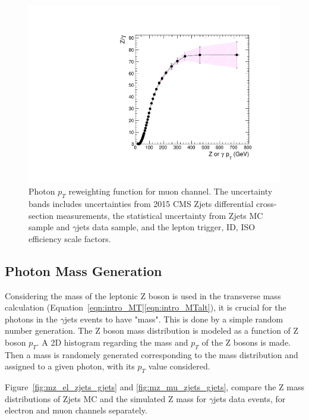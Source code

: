 \begin{figure}[htbp]
\centering
  \includegraphics[width=0.9\linewidth]{figures/study_gjets_data_allcorV2_modify_mu.pdf}
  \caption{Photon $p_T$ reweighting function for muon channel.
 The uncertainty bands includes uncertainties from 2015 CMS Zjets differential cross-section measurements, the statistical uncertainty from Zjets MC sample and $\gamma$jets data sample, and the lepton trigger, ID, ISO efficiency scale factors.}
  \label{fig:photon_pt_weight_mu}
\end{figure}

\subsection{Photon Mass Generation}
Considering the mass of the leptonic Z boson is used in the transverse mass calculation (Equation~\ref{eqn:intro_MT}\ref{eqn:intro_MTalt}), it is crucial for the photons in the $\gamma$jets events to have "mass". This is done by a simple random number generation. The Z boson mass distribution is modeled as a function of Z boson $p_T$. A 2D histogram regarding the mass and $p_T$ of the Z bosons is made. Then a mass is randomely generated corresponding to the mass distribution and assigned to a given photon, with its $p_T$ value considered.

\vspace{0.3cm}
Figure~\ref{fig:mz_el_zjets_gjets} and \ref{fig:mz_mu_zjets_gjets}, compare the Z mass distributions of Zjets MC and the simulated Z mass for $\gamma$jets data events, for electron and muon channels separately.

